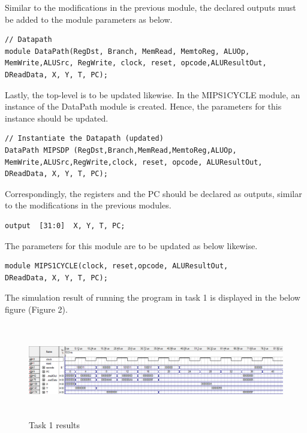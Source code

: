 \documentclass[12pt,a4paper]{article}
\begin{document}
	\noindent Similar to the modifications in the previous module, the declared outputs must be added to the module parameters as below.
	
	\vspace{-0.3cm}
	\begin{lstlisting}[style={verilog-style}]
// Datapath
module DataPath(RegDst, Branch, MemRead, MemtoReg, ALUOp, 
MemWrite,ALUSrc, RegWrite, clock, reset, opcode,ALUResultOut,
DReadData, X, Y, T, PC);
	\end{lstlisting}
	
	\noindent Lastly, the top-level is to be updated likewise. In the MIPS1CYCLE module, an instance of the DataPath module is created. Hence, the parameters for this instance should be updated. 

	\vspace{-0.3cm}
	\begin{lstlisting}[style={verilog-style}]
// Instantiate the Datapath (updated)
DataPath MIPSDP (RegDst,Branch,MemRead,MemtoReg,ALUOp,
MemWrite,ALUSrc,RegWrite,clock, reset, opcode, ALUResultOut,
DReadData, X, Y, T, PC);
	\end{lstlisting}
	
	\noindent Correspondingly, the registers and the PC should be declared as outputs, similar to the modifications in the previous modules. 
	
		\vspace{-0.4cm}
	\begin{lstlisting}[style={verilog-style}]
output	[31:0]	X, Y, T, PC;
	\end{lstlisting}
	
	\noindent The parameters for this module are to be updated as below likewise. 
	
		\vspace{-0.4cm}
\begin{lstlisting}[style={verilog-style}]
module MIPS1CYCLE(clock, reset,opcode, ALUResultOut,
DReadData, X, Y, T, PC);
\end{lstlisting}
	
	\noindent The simulation result of running the program in task 1 is displayed in the below figure (Figure 2). 
	
	\begin{figure}[H]
		\centering
		\includegraphics[height=4.1cm,width=15cm]{figures/simulations1.png}
		\caption{Task 1 results}
	\end{figure}
	
\end{document}
